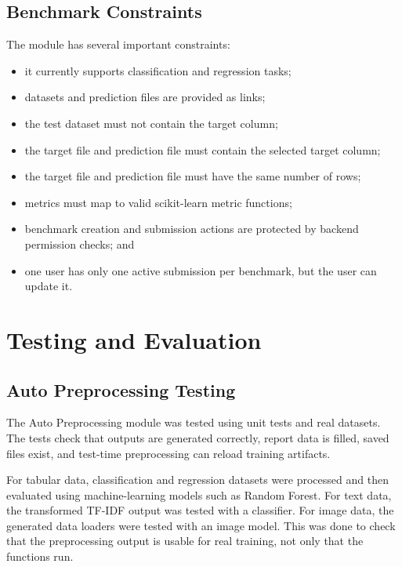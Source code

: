 \documentclass[12pt,a4paper,oneside]{report}
\begin{document}
\section{Benchmark Constraints}

The module has several important constraints:

\begin{itemize}[leftmargin=*]
  \item it currently supports classification and regression tasks;
  \item datasets and prediction files are provided as links;
  \item the test dataset must not contain the target column;
  \item the target file and prediction file must contain the selected target
        column;
  \item the target file and prediction file must have the same number of rows;
  \item metrics must map to valid scikit-learn metric functions;
  \item benchmark creation and submission actions are protected by backend
        permission checks; and
  \item one user has only one active submission per benchmark, but the user can
        update it.
\end{itemize}

\chapter{Testing and Evaluation}
\label{chap:testing}

\section{Auto Preprocessing Testing}

The Auto Preprocessing module was tested using unit tests and real datasets.
The tests check that outputs are generated correctly, report data is filled,
saved files exist, and test-time preprocessing can reload training artifacts.

For tabular data, classification and regression datasets were processed and
then evaluated using machine-learning models such as Random Forest. For text
data, the transformed TF-IDF output was tested with a classifier. For image
data, the generated data loaders were tested with an image model. This was done
to check that the preprocessing output is usable for real training, not only
that the functions run.
\end{document}
